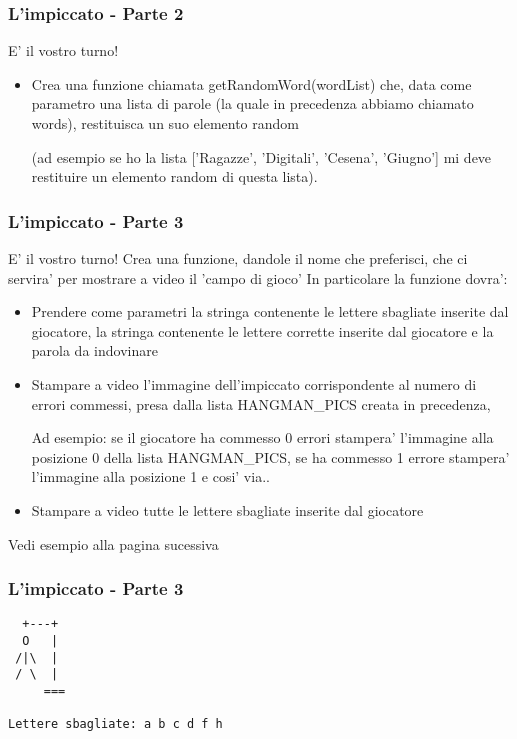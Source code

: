 \begin{frame}[fragile]
\frametitle{L'impiccato - Parte 2}

\begin{block}{E' il vostro turno!}

    \begin{itemize}
        \item Crea una funzione chiamata getRandomWord(wordList) che, data come parametro una lista di parole (la quale in precedenza abbiamo chiamato words), restituisca un suo elemento random
        
        (ad esempio se ho la lista ['Ragazze', 'Digitali', 'Cesena', 'Giugno'] mi deve restituire un elemento random di questa lista).
    \end{itemize}
\end{block}
\end{frame}

\begin{frame}[fragile]
\frametitle{L'impiccato - Parte 3}

\begin{block}{E' il vostro turno!}
Crea una funzione, dandole il nome che preferisci, che ci servira' per mostrare a video il 'campo di gioco'
In particolare la funzione dovra':
    \begin{itemize}
        \item Prendere come parametri la stringa contenente le lettere sbagliate inserite dal giocatore, la stringa contenente le lettere corrette inserite dal giocatore e la parola da indovinare
        \item Stampare a video l'immagine dell'impiccato corrispondente al numero di errori commessi, presa dalla lista HANGMAN\_PICS creata in precedenza, 
        
        Ad esempio: se il giocatore ha commesso 0 errori stampera' l'immagine alla posizione 0 della lista HANGMAN\_PICS, se ha commesso 1 errore stampera' l'immagine alla posizione 1 e cosi' via..
        \item Stampare a video tutte le lettere sbagliate inserite dal giocatore
    \end{itemize}
\end{block}

Vedi esempio alla pagina sucessiva
\end{frame}

\begin{frame}[fragile]
\frametitle{L'impiccato - Parte 3}

\begin{lstlisting}
  +---+
  O   |
 /|\  |
 / \  |
     ===

Lettere sbagliate: a b c d f h 
\end{lstlisting}

\end{frame}

